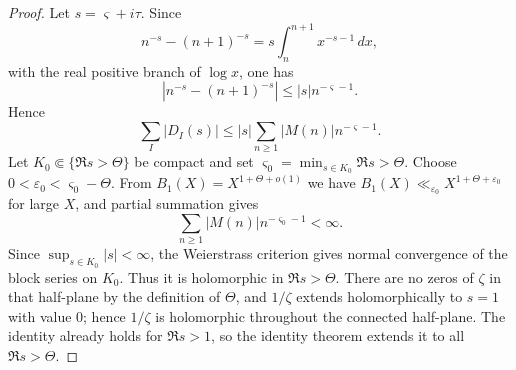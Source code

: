 \documentclass[11pt,reqno]{amsart}
\numberwithin{equation}{section}
\theoremstyle{plain}
\theoremstyle{definition}
\theoremstyle{remark}
\newcommand{\eps}{\varepsilon}
\begin{document}
\begin{proof}
Let $s=\varsigma+i\tau$.  Since
\begin{equation}
 n^{-s}-(n+1)^{-s}
 =s\int_n^{n+1}x^{-s-1}\,dx,
\end{equation}
with the real positive branch of $\log x$, one has
\begin{equation}
 |n^{-s}-(n+1)^{-s}|\le |s|n^{-\varsigma-1}.
\end{equation}
Hence
\begin{equation}
 \sum_I|D_I(s)|
 \le |s|\sum_{n\ge1}|M(n)|n^{-\varsigma-1}.
\end{equation}
Let $K_0\Subset\{\Re s>\Theta\}$ be compact and set
$\varsigma_0=\min_{s\in K_0}\Re s>\Theta$.  Choose
$0<\eps_0<\varsigma_0-\Theta$.  From
$B_1(X)=X^{1+\Theta+o(1)}$ we have
$B_1(X)\ll_{\eps_0}X^{1+\Theta+\eps_0}$ for large $X$, and partial
summation gives
\begin{equation}
 \sum_{n\ge1}|M(n)|n^{-\varsigma_0-1}<\infty.
\end{equation}
Since $\sup_{s\in K_0}|s|<\infty$, the Weierstrass criterion gives normal
convergence of the block series on $K_0$.  Thus it is holomorphic in
$\Re s>\Theta$.  There are no zeros of $\zeta$ in that half-plane by the
definition of $\Theta$, and $1/\zeta$ extends holomorphically to $s=1$ with
value $0$; hence $1/\zeta$ is holomorphic throughout the connected
half-plane.  The identity already holds for $\Re s>1$, so the
identity theorem extends it to all $\Re s>\Theta$.


\end{proof}
\end{document}
